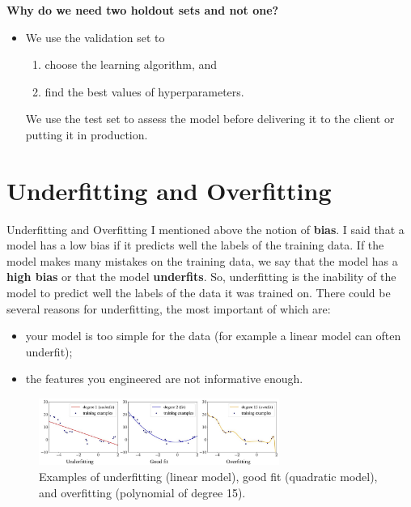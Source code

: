 \documentclass[8pt,dvipsnames]{beamer}
\begin{document}
\begin{frame}
	\textbf{Why do we need two holdout sets and not one? }
	\begin{itemize}
		\item We use the validation set to
		      \begin{enumerate}
			      \item choose the learning algorithm, and
			      \item  find the best values of hyperparameters.
		      \end{enumerate}
		      We use the test set to assess the model before delivering it to the client or putting it in production.
	\end{itemize}
\end{frame}

\section{Underfitting and Overfitting}
\begin{frame}{Underfitting and Overfitting}
	I mentioned above the notion of \textbf{bias}. I said that a model has a low bias if it predicts well the labels of the training data. If the model makes many mistakes on the training data, we say that the model has a \textbf{high bias} or that the model \textbf{underfits}. So, underfitting is the inability of the model to predict well the labels of the data it was trained on. There could be several reasons for underfitting, the most important of which are:
	\begin{itemize}
		\item your model is too simple for the data (for example a linear model can often underfit);
		\item the features you engineered are not informative enough.
	\end{itemize}
	\begin{figure}
		\centering
		\includegraphics[width=0.7\textwidth]{imgs/Basic_Practice_2.jpeg}
		\caption{Examples of underfitting (linear model), good fit (quadratic model), and overfitting (polynomial of degree 15).}
	\end{figure}
\end{frame}
\end{document}
